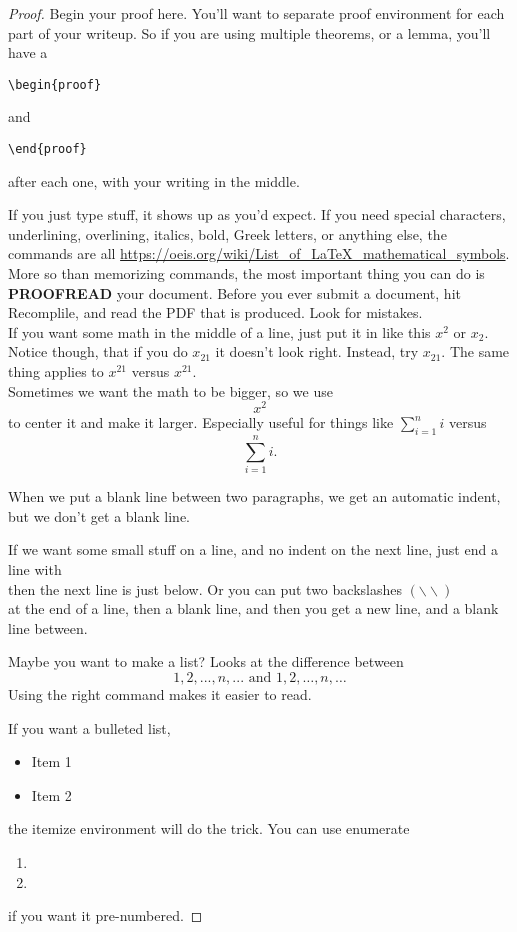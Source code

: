\documentclass[12 pt]{article}
\theoremstyle{definition}
\begin{document}
\begin{proof}
Begin your proof here. You'll want to separate proof environment for each part of your writeup. So if you are using multiple theorems, or a lemma, you'll have a \begin{verbatim}\begin{proof}\end{verbatim}and \begin{verbatim}\end{proof}\end{verbatim} after each one, with your writing in the middle.


If you just type stuff, it shows up as you'd expect. If you need special characters, underlining, overlining, italics, bold, Greek letters, or anything else, the commands are all  \url{https://oeis.org/wiki/List_of_LaTeX_mathematical_symbols}.\\

More so than memorizing commands, the most important thing you can do is \textbf{PROOFREAD} your document. Before you ever submit a document, hit Recomplile, and read the PDF that is produced. Look for mistakes.\\

If you want some math in the middle of a line, just put it in like this $x^2$ or $x_2$. Notice though, that if you do $x_21$ it doesn't look right. Instead, try $x_{21}$. The same thing applies to $x^21$ versus $x^{21}$.\\

Sometimes we want the math to be bigger, so we use $$x^2$$ to center it and make it larger. Especially useful for things like $\sum_{i=1}^n i$ versus $$\sum_{i=1}^n i.$$

When we put a blank line between two paragraphs, we get an automatic indent, but we don't get a blank line.

If we want some small stuff on a line, and no indent on the next line, just end a line with \\
then the next line is just below. Or you can put two backslashes $(\backslash\backslash)$ \\

at the end of a line, then a blank line, and then you get a new line, and a blank line between.

Maybe you want to make a list? Looks at the difference between 
$$1,2,...,n,... \mbox{ and } 1,2,\ldots,n,\ldots$$
Using the right command makes it easier to read.

If you want a bulleted list,
\begin{itemize}
\item Item 1
\item Item 2
\end{itemize}
the itemize environment will do the trick. You can use enumerate
\begin{enumerate}
\item
\item
\end{enumerate}
if you want it pre-numbered.


\end{proof}
\end{document}
